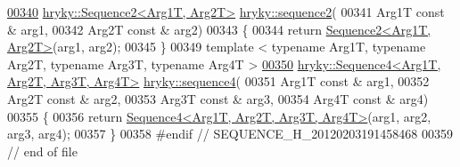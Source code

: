 \begin{DoxyCode}
\hypertarget{sequence_8h_source_l00340}{}\hyperlink{namespacehryky_af306f38c62df81dd0dc791c0ee2665b2}{00340} \hyperlink{classhryky_1_1_sequence2}{hryky::Sequence2<Arg1T, Arg2T>} \hyperlink{namespacehryky_af306f38c62df81dd0dc791c0ee2665b2}{hryky::sequence2}(
00341     Arg1T \textcolor{keyword}{const} & arg1,
00342     Arg2T \textcolor{keyword}{const} & arg2)
00343 \{
00344     \textcolor{keywordflow}{return} \hyperlink{classhryky_1_1_sequence2}{Sequence2<Arg1T, Arg2T>}(arg1, arg2);
00345 \}
00349 \textcolor{keyword}{template} < \textcolor{keyword}{typename} Arg1T, \textcolor{keyword}{typename} Arg2T, \textcolor{keyword}{typename} Arg3T, \textcolor{keyword}{typename} Arg4T >
\hypertarget{sequence_8h_source_l00350}{}\hyperlink{namespacehryky_a2107ad509c2a26ac350cb1d10ad6c453}{00350} \hyperlink{classhryky_1_1_sequence4}{hryky::Sequence4<Arg1T, Arg2T, Arg3T, Arg4T>} \hyperlink{namespacehryky_a2107ad509c2a26ac350cb1d10ad6c453}{hryky::sequence4}(
00351     Arg1T \textcolor{keyword}{const} & arg1,
00352     Arg2T \textcolor{keyword}{const} & arg2,
00353     Arg3T \textcolor{keyword}{const} & arg3,
00354     Arg4T \textcolor{keyword}{const} & arg4)
00355 \{
00356     \textcolor{keywordflow}{return} \hyperlink{classhryky_1_1_sequence4}{Sequence4<Arg1T, Arg2T, Arg3T, Arg4T>}(arg1, arg2, arg3, arg4);
00357 \}
00358 \textcolor{preprocessor}{#endif // SEQUENCE\_H\_20120203191458468}
00359 \textcolor{preprocessor}{}\textcolor{comment}{// end of file}
\end{DoxyCode}
